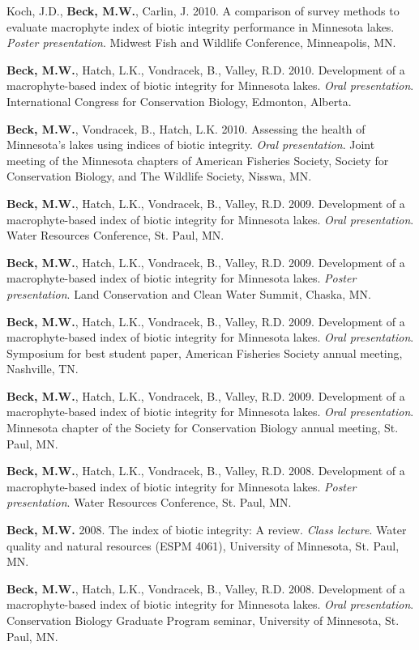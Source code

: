 \documentclass[letterpaper,12pt]{article}
\begin{document}
Koch, J.D., {\bf Beck, M.W.}, Carlin, J. 2010. A comparison of survey methods to evaluate macrophyte index of biotic integrity performance in Minnesota lakes. \textit{Poster presentation}. Midwest Fish and Wildlife Conference, Minneapolis, MN.

{\bf Beck, M.W.}, Hatch, L.K., Vondracek, B., Valley, R.D. 2010. Development of a macrophyte-based index of biotic integrity for Minnesota lakes. \textit{Oral presentation}. International Congress for Conservation Biology, Edmonton, Alberta.

{\bf Beck, M.W.}, Vondracek, B., Hatch, L.K. 2010. Assessing the health of Minnesota's lakes using indices of biotic integrity. \textit{Oral presentation}. Joint meeting of the Minnesota chapters of American Fisheries Society, Society for Conservation Biology, and The Wildlife Society, Nisswa, MN.

{\bf Beck, M.W.}, Hatch, L.K., Vondracek, B., Valley, R.D. 2009. Development of a macrophyte-based index of biotic integrity for Minnesota lakes. \textit{Oral presentation}. Water Resources Conference, St. Paul, MN.

{\bf Beck, M.W.}, Hatch, L.K., Vondracek, B., Valley, R.D. 2009. Development of a macrophyte-based index of biotic integrity for Minnesota lakes. \textit{Poster presentation}. Land Conservation and Clean Water Summit, Chaska, MN.

{\bf Beck, M.W.}, Hatch, L.K., Vondracek, B., Valley, R.D. 2009. Development of a macrophyte-based index of biotic integrity for Minnesota lakes. \textit{Oral presentation}. Symposium for best student paper, American Fisheries Society annual meeting, Nashville, TN.

{\bf Beck, M.W.}, Hatch, L.K., Vondracek, B., Valley, R.D. 2009. Development of a macrophyte-based index of biotic integrity for Minnesota lakes. \textit{Oral presentation}. Minnesota chapter of the Society for Conservation Biology annual meeting, St. Paul, MN.

{\bf Beck, M.W.}, Hatch, L.K., Vondracek, B., Valley, R.D. 2008. Development of a macrophyte-based index of biotic integrity for Minnesota lakes. \textit{Poster presentation}. Water Resources Conference, St. Paul, MN.

{\bf Beck, M.W.} 2008. The index of biotic integrity: A review. \textit{Class lecture}. Water quality and natural resources (ESPM 4061), University of Minnesota, St. Paul, MN.

{\bf Beck, M.W.}, Hatch, L.K., Vondracek, B., Valley, R.D. 2008. Development of a macrophyte-based index of biotic integrity for Minnesota lakes. \textit{Oral presentation}. Conservation Biology Graduate Program seminar, University of Minnesota, St. Paul, MN.
\end{document}
